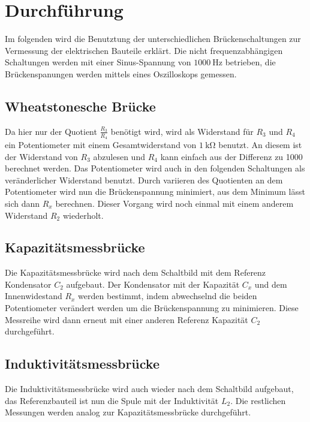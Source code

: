 \section{Durchführung}

    \noindent Im folgenden wird die Benutztung der unterschiedlichen Brückenschaltungen zur Vermessung der elektrischen Bauteile erklärt. Die 
    nicht frequenzabhängigen Schaltungen werden mit einer Sinus-Spannung von $\SI{1000}{\hertz}$ betrieben, die Brückenspanungen werden mittels 
    eines Oszilloskops gemessen.

    \subsection{Wheatstonesche Brücke}

        \noindent Da hier nur der Quotient $\frac{R_3}{R_4}$ benötigt wird, wird als Widerstand für $R_3$ und $R_4$ ein Potentiometer mit 
        einem Gesamtwiderstand von $\SI{1}{\kilo\ohm}$ benutzt. An diesem ist der Widerstand von $R_3$ abzulesen und $R_4$ kann einfach 
        aus der Differenz zu 1000 berechnet werden. Das Potentiometer wird auch in den folgenden Schaltungen als veränderlicher Widerstand 
        benutzt. Durch variieren des Quotienten an dem Potentiometer wird nun die Brückenspannung minimiert, aus dem Minimum lässt sich dann 
        $R_x$ berechnen. Dieser Vorgang wird noch einmal mit einem anderem Widerstand $R_2$ wiederholt.

    \subsection{Kapazitätsmessbrücke}

        \noindent Die Kapazitätsmessbrücke wird nach dem Schaltbild mit dem Referenz Kondensator $C_2$ aufgebaut. Der Kondensator mit der 
        Kapazität $C_x$ und dem Innenwidestand $R_x$ werden bestimmt, indem abwechselnd die beiden Potentiometer verändert werden um die 
        Brückenspannung zu minimieren. Diese Messreihe wird dann erneut mit einer anderen Referenz Kapazität $C_2$ durchgeführt.

    \subsection{Induktivitätsmessbrücke}

        \noindent Die Induktivitätsmessbrücke wird auch wieder nach dem Schaltbild aufgebaut, das Referenzbauteil ist nun die Spule mit 
        der Induktivität $L_2$. Die restlichen Messungen werden analog zur Kapazitätsmessbrücke durchgeführt.

